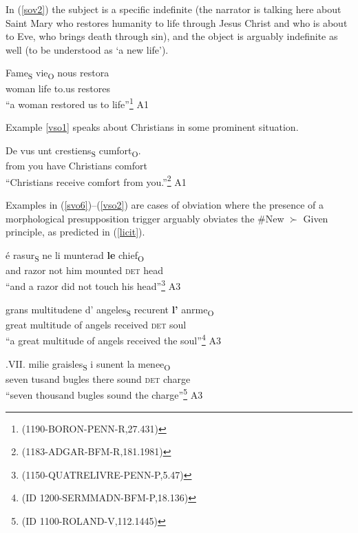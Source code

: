 \documentclass[output=paper,modfonts,nonflat]{langsci/langscibook}
\begin{document}
In (\ref{sov2}) the subject is a specific indefinite (the narrator is talking here about Saint Mary who restores humanity to life through Jesus Christ and who is about to Eve, who brings death through sin), and the object is arguably indefinite as well (to be understood as `a new life').

\ea
\gll Fame\textsubscript{S} vie\textsubscript{O} nous restora\\
woman life to.us restores\\
\glt ``a woman restored us to life''\footnote{{(1190-BORON-PENN-R,27.431)}}\label{sov2} \hfill A1
\z

Example \ref{vso1} speaks about Christians in some prominent situation.

\ea
\gll De vus unt crestiens\textsubscript{S} cumfort\textsubscript{O}.\\
from you have Christians comfort\\
\glt ``Christians receive comfort from you.''\footnote{{(1183-ADGAR-BFM-R,181.1981)}}\label{vso1} \hfill A1
\z

Examples in (\ref{svo6})--(\ref{vso2}) are cases of obviation where the presence of a morphological presupposition trigger arguably obviates the \#New $\succ$ Given principle, as predicted in (\ref{licit}).

\ea
\gll \'{e} rasur\textsubscript{S} ne li munterad {\bfseries le} chief\textsubscript{O}\\
and razor not him mounted {\scshape det} head\\
\glt ``and a razor did not touch his head''\footnote{{(1150-QUATRELIVRE-PENN-P,5.47)}}\label{svo6} \hfill A3
\z

\ea
\gll grans multitudene d' angeles\textsubscript{S} recurent {\bfseries l'} anrme\textsubscript{O}\\
great multitude of angels received {\scshape det} soul\\
\glt ``a great multitude of angels received the soul''\footnote{{(ID 1200-SERMMADN-BFM-P,18.136)}}\label{svo7} \hfill A3
\z



\ea 
\gll .VII. milie graisles\textsubscript{S} i sunent la menee\textsubscript{O}\\
seven tusand bugles there sound {\scshape det} charge\\ 
\glt ``seven thousand bugles sound the charge''\footnote{{(ID 1100-ROLAND-V,112.1445)}}\label{sov3}  \hfill A3
\z 
\end{document}
